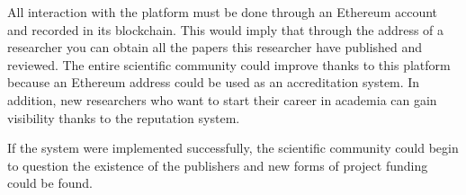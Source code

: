 All interaction with the platform must be done through an Ethereum account and
recorded in its blockchain. This would imply that through the address of a
researcher you can obtain all the papers this researcher have published and
reviewed. The entire scientific community could improve thanks to this platform
because an Ethereum address could be used as an accreditation system. In
addition, new researchers who want to start their career in academia can gain
visibility thanks to the reputation system.

If the system were implemented successfully, the scientific community could
begin to question the existence of the publishers and new forms of project
funding could be found.




